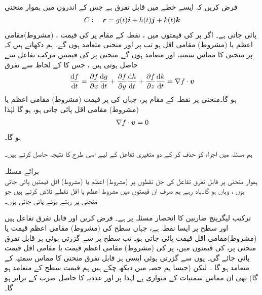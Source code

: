 \\
 فرض کریں   کہ   ایسے خطے میں قابل تفرق ہے جس کے  اندرون میں ہموار منحنی
\begin{align*}
C:\quad {\ensuremath{{\boldsymbol{r}}}}=g(t){\boldsymbol{i}}+h(t){\boldsymbol{j}}+k(t){\boldsymbol{k}}
\end{align*}
پائی جاتی ہے۔ اگر    پر  کی قیمتوں میں   ، نقطہ   کے مقام پر   کی قیمت   ،  (مشروط)مقامی  اعظم یا (مشروط)  مقامی اقل   ہو   تب  پر   اور منحنی  متعامد ہوں گے۔ 
ہم دکھاتے ہیں کہ  پر منحنی   کا  مماس  سمتیہ  اور   متعامد ہوں گے۔منحنی  پر  کی قیمتیں  مرکب تفاعل    سے حاصل ہوتی  ہیں ، جس کا  کے لحاظ سے تفرق
\begin{align*}
\frac{\dif f}{\dif t}=\frac{\partial f}{\partial x}\frac{\dif g}{\dif t}+\frac{\partial f}{\partial y}\frac{\dif h}{\dif t}+\frac{\partial f}{\partial z}\frac{\dif k}{\dif t}=\nabla f\cdot \kvec{v}
\end{align*}
ہو گا۔منحنی پر     نقطہ    کے مقام پر، جہاں  کی         پر قیمت (مشروط)   مقامی اعظم یا  (مشروط) مقامی اقل  پائی جاتی ہو،  ہو گا    لہٰذا
\begin{align*}
\nabla f\cdot {\ensuremath{{\boldsymbol{v}}}}=0
\end{align*}
ہو گا۔

ہم مسئلہ  میں  اجزاء کو حذف  کر کے دو متغیری  تفاعل  کے لیے اسی طرح کا نتیجہ حاصل کرتے ہیں۔

برائے مسئلہ \\
ہموار منحنی   پر   قابل تفرق تفاعل  کی  جن نقطوں  پر   (مشروط)  اعظم یا (مشروط)  اقل قیمتیں پائی جاتی ہوں ، وہاں  ہو گا۔یاد رہے ہم صرف ان قیمتوں میں  مشروط اعظم یا اقل نقطے تلاش کرتے ہیں جو منحنی پر رہتے ہوئے پائی جاتی ہوں۔

ترکیب لیگرینج  ضاربین کا انحصار مسئلہ   پر ہے۔  فرض کریں  اور  قابل تفرق تفاعل  ہیں اور  سطح  پر   ایسا نقطہ ہے،   جہاں  سطح  کی (مشروط) مقامی اعظم قیمت یا  (مشروط)مقامی اقل قیمت پائی جاتی ہو۔ تب  سطح  پر  سے  گزرتی ہوئی  ہر قابل تفرق منحنی پر،    کی قیمتوں میں،   پر  کی (مشروط)   مقامی اعظم قیمت یا مقامی اقل قیمت پائی جائے گی۔ یوں  سے گزرتی ہوئی ایسی ہر قابل تفرق  منحنی کا  مماس سمتیہ    کے متعامد  ہو گا  ۔ لیکن   (جیسا ہم حصہ  میں دیکھ چکے ہیں   ہم قیمت سطح  کے متعامد  ہو گا) بھی ان مماس  سمتیات  کے متوازی   ہے لہٰذا  پر  اور عددیہ   کا حاصل ضرب  کے برابر ہو گا۔ 

